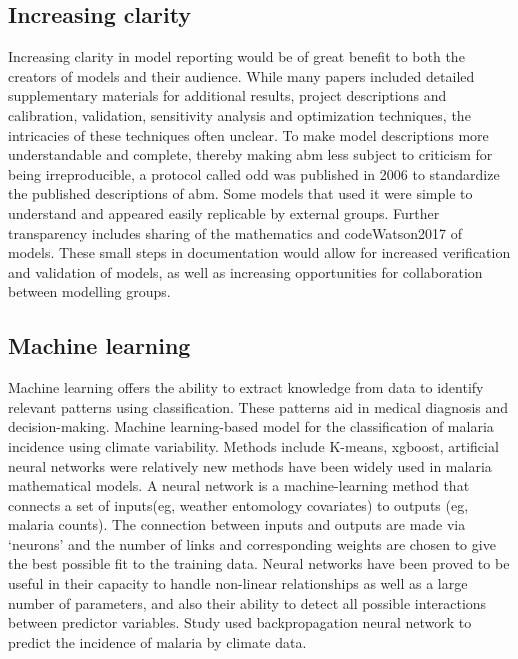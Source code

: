 \documentclass[a4paper, 12pt, twoside]{article}
\begin{document}
\subsection{Increasing clarity}%
\label{sub:incresing_clarity}
Increasing clarity in model reporting would be of great benefit to both the creators of models and their audience.
While many papers included detailed supplementary materials for additional results, project descriptions and calibration, validation, sensitivity analysis and optimization techniques, the intricacies of these techniques often unclear.
To make model descriptions more understandable and complete, thereby making \gls{abm} less subject to criticism for being irreproducible, a protocol called \gls{odd} \cite{Grimm2010} was published in 2006 to standardize the published descriptions of \gls{abm}.
Some models that used it \cite{Zhu2015, Zhu2015a, Watson2017} were simple to understand and appeared easily replicable by external groups.
Further transparency includes sharing of the mathematics and code{Watson2017} of models. These small steps in documentation would allow for increased verification and validation of models, as well as increasing opportunities for collaboration between modelling groups.

\subsection{Machine learning}%
\label{sub:machine_learning}
Machine learning offers the ability to extract knowledge from data to identify relevant patterns using classification. These patterns aid in medical diagnosis and decision-making.
Machine learning-based model for the classification of malaria incidence using climate variability.
Methods include K-means, \gls{xgboost}, artificial neural networks were relatively new methods have been widely used in malaria mathematical models.
A neural network is a machine-learning method that connects a set of inputs(eg, weather entomology covariates) to outputs (eg, malaria counts).
The connection between inputs and outputs are made via ‘neurons’ and the number of links and corresponding weights are chosen to give the best possible fit to the training data.
Neural networks have been proved to be useful in their capacity to handle non-linear relationships as well as a large number of parameters, and also their ability to detect all possible interactions between predictor variables.
Study\cite{Verma2020} used backpropagation neural network to predict the incidence of malaria by climate data.
\end{document}
